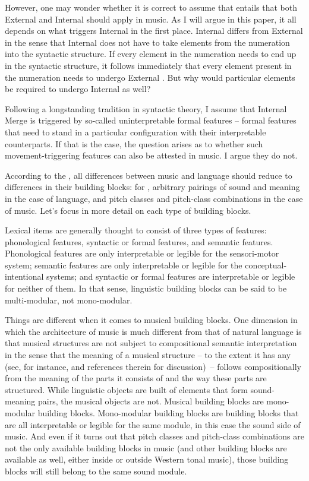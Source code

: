 \documentclass[output=paper]{langsci/langscibook}
\begin{document}
However, one may wonder whether it is correct to assume that  entails that both External and Internal
 should apply in music. As I will argue in this paper, it all
depends on what triggers Internal  in the first place. Internal
 differs from External  in the sense that Internal 
does not have to take elements from the numeration into the syntactic
structure. If every element in the numeration needs to end up in the syntactic
structure, it follows immediately that every element present in the numeration
needs to undergo External . But why would particular elements be
required to undergo Internal  as well?

Following a longstanding tradition in syntactic theory, I assume that Internal
Merge is triggered by so-called uninterpretable formal features -- formal
features that need to stand in a particular configuration with their
interpretable counterparts. If that is the case, the question arises as to
whether such movement-triggering features can also be attested in music. I
argue they do not.

According to the , all differences
between music and language should reduce to differences in their building
blocks: for \citeauthor{KatzPes2011}, arbitrary pairings of sound and meaning
in the case of language, and pitch classes and pitch-class combinations in the
case of music. Let’s focus in more detail on each type of building blocks.

Lexical items are generally thought to consist of three types of features:
phonological features, syntactic or formal features, and semantic features.
Phonological features are only interpretable or legible for the sensori-motor
system; semantic features are only interpretable or legible for the
conceptual-intentional systems; and syntactic or formal features are
interpretable or legible for neither of them. In that sense, linguistic
building blocks can be said to be multi-modular, not mono-modular.

Things are different when it comes to musical building blocks. One dimension in
which the architecture of music is much different from that of natural language
is that musical structures are not subject to compositional semantic
interpretation in the sense that the meaning of a musical structure – to the
extent it has any (see, for instance, \citealt{Schlenker2016} and references
therein for discussion)~– follows compositionally from the meaning of the parts
it consists of and the way these parts are structured. While linguistic objects
are built of elements that form sound-meaning pairs, the musical objects are
not. Musical building blocks are mono-modular building blocks. Mono-modular
building blocks are building blocks that are all interpretable or legible for
the same module, in this case the sound side of music. And even if it turns out
that pitch classes and pitch-class combinations are not the only available
building blocks in music (and other building blocks are available as well,
either inside or outside Western tonal music), those building blocks will still
belong to the same sound module.
\end{document}
